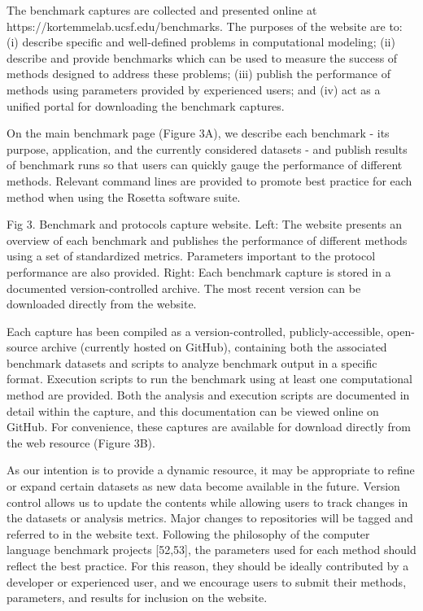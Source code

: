 The benchmark captures are collected and presented online at  https://kortemmelab.ucsf.edu/benchmarks. The purposes of the website are to: (i) describe specific and well-defined problems in computational modeling; (ii) describe and provide benchmarks which can be used to measure the success of methods designed to address these problems; (iii) publish the performance of methods using parameters provided by experienced users; and (iv) act as a unified portal for downloading the benchmark captures.

On the main benchmark page (Figure 3A), we describe each benchmark - its purpose, application, and the currently considered datasets - and publish results of benchmark runs so that users can quickly gauge the performance of different methods. Relevant command lines are provided to promote best practice for each method when using the Rosetta software suite.

Fig 3. Benchmark and protocols capture website.
Left: The website presents an overview of each benchmark and publishes the performance of different methods using a set of standardized metrics. Parameters important to the protocol performance are also provided. Right: Each benchmark capture is stored in a documented version-controlled archive. The most recent version can be downloaded directly from the website.


Each capture has been compiled as a version-controlled, publicly-accessible, open-source archive (currently hosted on GitHub), containing both the associated benchmark datasets and scripts to analyze benchmark output in a specific format. Execution scripts to run the benchmark using at least one computational method are provided. Both the analysis and execution scripts are documented in detail within the capture, and this documentation can be viewed online on GitHub. For convenience, these captures are available for download directly from the web resource (Figure 3B).

As our intention is to provide a dynamic resource, it may be appropriate to refine or expand certain datasets as new data become available in the future. Version control allows us to update the contents while allowing users to track changes in the datasets or analysis metrics. Major changes to repositories will be tagged and referred to in the website text. Following the philosophy of the computer language benchmark projects [52,53], the parameters used for each method should reflect the best practice. For this reason, they should be ideally contributed by a developer or experienced user, and we encourage users to submit their methods, parameters, and results for inclusion on the website.

